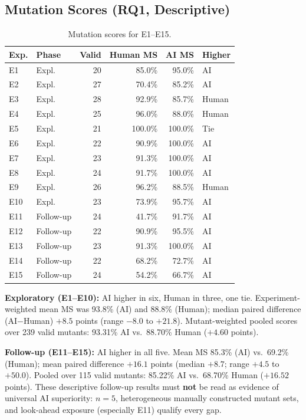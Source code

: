 \documentclass[10pt,conference,a4paper]{IEEEtran}
\begin{document}
\subsection{Mutation Scores (RQ1, Descriptive)}
\begin{table}[t]
\centering
\caption{Mutation scores for E1--E15.}
\label{tab:ms}
\small
\setlength{\tabcolsep}{3.5pt}
\begin{tabular}{@{}llrrrl@{}}
\toprule
Exp. & Phase & Valid & Human MS & AI MS & Higher \\
\midrule
E1 & Expl. & 20 & 85.0\% & 95.0\% & AI \\
E2 & Expl. & 27 & 70.4\% & 85.2\% & AI \\
E3 & Expl. & 28 & 92.9\% & 85.7\% & Human \\
E4 & Expl. & 25 & 96.0\% & 88.0\% & Human \\
E5 & Expl. & 21 & 100.0\% & 100.0\% & Tie \\
E6 & Expl. & 22 & 90.9\% & 100.0\% & AI \\
E7 & Expl. & 23 & 91.3\% & 100.0\% & AI \\
E8 & Expl. & 24 & 91.7\% & 100.0\% & AI \\
E9 & Expl. & 26 & 96.2\% & 88.5\% & Human \\
E10 & Expl. & 23 & 73.9\% & 95.7\% & AI \\
E11 & Follow-up & 24 & 41.7\% & 91.7\% & AI \\
E12 & Follow-up & 22 & 90.9\% & 95.5\% & AI \\
E13 & Follow-up & 23 & 91.3\% & 100.0\% & AI \\
E14 & Follow-up & 22 & 68.2\% & 72.7\% & AI \\
E15 & Follow-up & 24 & 54.2\% & 66.7\% & AI \\
\bottomrule
\end{tabular}
\end{table}

\textbf{Exploratory (E1--E10):} AI higher in six, Human in three, one tie. Experiment-weighted mean MS was 93.8\% (AI) and 88.8\% (Human); median paired difference (AI$-$Human) $+8.5$ points (range $-8.0$ to $+21.8$). Mutant-weighted pooled scores over 239 valid mutants: 93.31\% AI vs.\ 88.70\% Human ($+4.60$ points).

\textbf{Follow-up (E11--E15):} AI higher in all five. Mean MS 85.3\% (AI) vs.\ 69.2\% (Human); mean paired difference $\mathbf{+16.1}$ points (median $+8.7$; range $+4.5$ to $+50.0$). Pooled over 115 valid mutants: 85.22\% AI vs.\ 68.70\% Human ($+16.52$ points). These descriptive follow-up results must \textbf{not} be read as evidence of universal AI superiority: $n{=}5$, heterogeneous manually constructed mutant sets, and look-ahead exposure (especially E11) qualify every gap.
\end{document}

